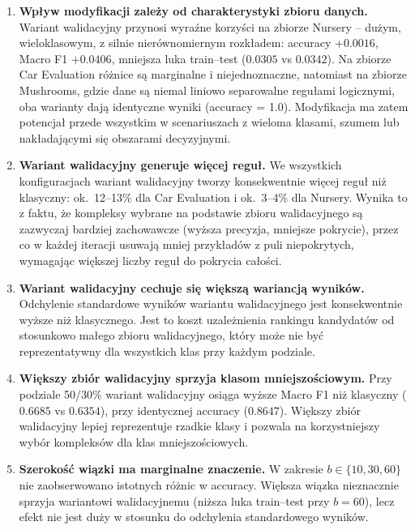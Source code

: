 \documentclass[12pt,a4paper]{article}
\begin{document}
\begin{enumerate}

  \item \textbf{Wpływ modyfikacji zależy od charakterystyki zbioru danych.}
        Wariant walidacyjny przynosi wyraźne korzyści na zbiorze Nursery --
        dużym, wieloklasowym, z silnie nierównomiernym rozkładem:
        accuracy $+0.0016$, Macro F1 $+0.0406$, mniejsza luka train--test
        ($0.0305$ vs $0.0342$).
        Na zbiorze Car Evaluation różnice są marginalne i niejednoznaczne,
        natomiast na zbiorze Mushrooms, gdzie dane są niemal liniowo separowalne
        regułami logicznymi, oba warianty dają identyczne wyniki (accuracy = 1.0).
        Modyfikacja ma zatem potencjał przede wszystkim w scenariuszach
        z wieloma klasami, szumem lub nakładającymi się obszarami decyzyjnymi.

  \item \textbf{Wariant walidacyjny generuje więcej reguł.}
        We wszystkich konfiguracjach wariant walidacyjny tworzy konsekwentnie więcej
        reguł niż klasyczny: ok.\ 12--13\% dla Car Evaluation i ok.\ 3--4\%
        dla Nursery. Wynika to z faktu, że kompleksy wybrane na podstawie
        zbioru walidacyjnego są zazwyczaj bardziej zachowawcze (wyższa precyzja,
        mniejsze pokrycie), przez co w każdej iteracji usuwają mniej przykładów
        z puli niepokrytych, wymagając większej liczby reguł do pokrycia całości.

  \item \textbf{Wariant walidacyjny cechuje się większą wariancją wyników.}
        Odchylenie standardowe wyników wariantu walidacyjnego jest konsekwentnie
        wyższe niż klasycznego. Jest to koszt uzależnienia rankingu kandydatów
        od stosunkowo małego zbioru walidacyjnego, który może nie być
        reprezentatywny dla wszystkich klas przy każdym podziale.

  \item \textbf{Większy zbiór walidacyjny sprzyja klasom mniejszościowym.}
        Przy podziale 50/30\% wariant walidacyjny osiąga wyższe Macro F1 niż
        klasyczny ($0.6685$ vs $0.6354$), przy identycznej accuracy ($0.8647$).
        Większy zbiór walidacyjny lepiej reprezentuje rzadkie klasy i pozwala
        na korzystniejszy wybór kompleksów dla klas mniejszościowych.

  \item \textbf{Szerokość wiązki ma marginalne znaczenie.}
        W zakresie $b \in \{10, 30, 60\}$ nie zaobserwowano istotnych różnic
        w accuracy. Większa wiązka nieznacznie sprzyja wariantowi walidacyjnemu
        (niższa luka train--test przy $b = 60$), lecz efekt nie jest duży
        w stosunku do odchylenia standardowego wyników.

\end{enumerate}
\end{document}
